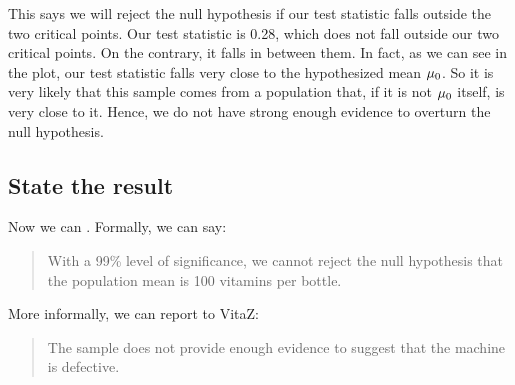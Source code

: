 \documentclass[../../../main.tex]{subfiles}
\begin{document}
\noindent
This says we will reject the null hypothesis if our test statistic falls outside the two critical points. Our test statistic is 0.28, which does not fall outside our two critical points. On the contrary, it falls in between them. In fact, as we can see in the plot, our test statistic falls very close to the hypothesized mean $\HypPopMean/$. So it is very likely that this sample comes from a population that, if it is not $\HypPopMean/$ itself, is very close to it. Hence, we do not have strong enough evidence to overturn the null hypothesis.


\subsection{State the result}

Now we can . Formally, we can say:

\begin{quote}
  With a 99\% level of significance, we cannot reject the null hypothesis that the population mean is 100 vitamins per bottle.
\end{quote}

\noindent
More informally, we can report to VitaZ:

\begin{quote}
  The sample does not provide enough evidence to suggest that the machine is defective.
\end{quote}
\end{document}
